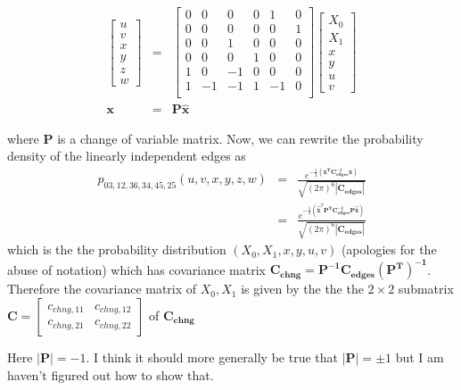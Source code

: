 \begin{eqnarray*}
    \begin{bmatrix}
    u \\
    v \\
    x \\
    y \\
    z \\
    w
    \end{bmatrix}  &=& \begin{bmatrix}
        0 & 0 & 0 & 0 & 1 & 0  \\
        0 & 0 & 0 & 0 & 0 & 1 \\
        0 & 0 & 1 & 0 & 0 & 0  \\
        0 & 0 & 0 & 1 & 0 & 0  \\
        1 & 0 & -1 & 0 & 0 & 0  \\
        1 & -1 & -1 & 1 & -1 & 0  \\
    \end{bmatrix} \begin{bmatrix}
        X_0 \\ 
        X_1 \\
        x \\
        y \\
        u \\ 
        v 
    \end{bmatrix} \\
    \mathbf{x} &=& \mathbf{P} \boldsymbol{\hat{x} }
\end{eqnarray*}

where $\mathbf{P}$ is a change of variable matrix.  Now, we can rewrite the probability density of the linearly independent edges as 
\begin{eqnarray*}
    p_{03,12,36,34,45,25}(u,v,x,y,z,w) &=&  \frac{e^{ -\frac{1}{2}( \mathbf{x^TC_{edges}^{-1}x}  ) }}{\sqrt{ (2\pi)^6 |\mathbf{C_{edges}}| }} \\
    &=& \frac{e^{ -\frac{1}{2}( \boldsymbol{\hat{x}}^T \mathbf{P^TC_{edges}^{-1}P} \boldsymbol{\hat{x}}  ) }}{\sqrt{ (2\pi)^6 |\mathbf{C_{edges}}| }}
\end{eqnarray*}
which is the the probability distribution $(X_0,X_1,x,y,u,v)$ (apologies for the abuse of notation) which has covariance matrix $\mathbf{C_{chng}} = \mathbf{P^{-1}C_{edges}(P^T)^{-1}}$. Therefore the covariance matrix of $X_0,X_1$ is given by the the the $2 \times 2$ submatrix $ \mathbf{C} = \begin{bmatrix}
    c_{chng,11} & c_{chng,12} \\
    c_{chng,21} & c_{chng,22}
\end{bmatrix}$ of $\mathbf{C_{chng}}$
\begin{note}
    Here $|\mathbf{P}| = -1$. I think it should more generally be true that $|\mathbf{P}|=\pm1$ but I am haven't figured out how to show that. 
\end{note}

